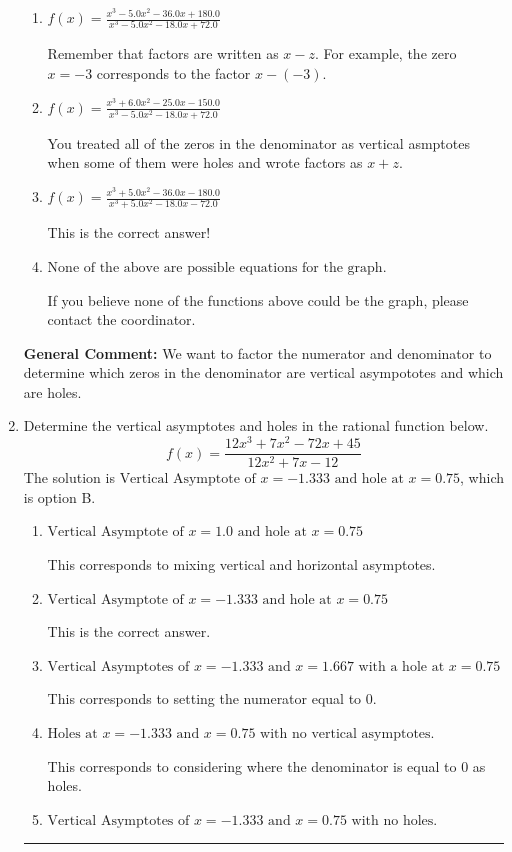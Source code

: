 \documentclass{extbook}[14pt]
\newcommand{\litem}[1]{\item #1

\rule{\textwidth}{0.4pt}}
\begin{document}
\begin{enumerate}
{\begin{enumerate}[label=\Alph*.]
You treated all of the zeros in the denominator as vertical asymptotes when some of them were holes!
\item \( f(x)=\frac{x^{3} -5.0 x^{2} -36.0 x + 180.0}{x^{3} -5.0 x^{2} -18.0 x + 72.0} \)

Remember that factors are written as $x-z$. For example, the zero $x=-3$ corresponds to the factor $x-(-3)$.
\item \( f(x)=\frac{x^{3} +6.0 x^{2} -25.0 x -150.0}{x^{3} -5.0 x^{2} -18.0 x + 72.0} \)

You treated all of the zeros in the denominator as vertical asmptotes when some of them were holes and wrote factors as $x+z$.
\item \( f(x)=\frac{x^{3} +5.0 x^{2} -36.0 x -180.0}{x^{3} +5.0 x^{2} -18.0 x -72.0} \)

This is the correct answer!
\item \( \text{None of the above are possible equations for the graph.} \)

If you believe none of the functions above could be the graph, please contact the coordinator.
\end{enumerate}

\textbf{General Comment:} We want to factor the numerator and denominator to determine which zeros in the denominator are vertical asympototes and which are holes.
}
\litem{
Determine the vertical asymptotes and holes in the rational function below.
\[ f(x) = \frac{12x^{3} +7 x^{2} -72 x + 45}{12x^{2} +7 x -12} \]The solution is \( \text{Vertical Asymptote of } x = -1.333 \text{ and hole at } x = 0.75 \), which is option B.\begin{enumerate}[label=\Alph*.]
\item \( \text{Vertical Asymptote of } x = 1.0 \text{ and hole at } x = 0.75 \)

This corresponds to mixing vertical and horizontal asymptotes.
\item \( \text{Vertical Asymptote of } x = -1.333 \text{ and hole at } x = 0.75 \)

This is the correct answer.
\item \( \text{Vertical Asymptotes of } x = -1.333 \text{ and } x = 1.667 \text{ with a hole at } x = 0.75 \)

This corresponds to setting the numerator equal to 0.
\item \( \text{Holes at } x = -1.333 \text{ and } x = 0.75 \text{ with no vertical asymptotes.} \)

This corresponds to considering where the denominator is equal to 0 as holes.
\item \( \text{Vertical Asymptotes of } x = -1.333 \text{ and } x = 0.75 \text{ with no holes.} \)


\end{enumerate}}
\end{enumerate}
\end{document}
